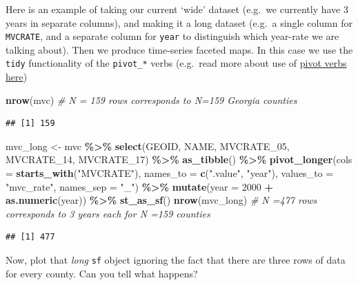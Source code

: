 \documentclass[
]{book}
\newenvironment{Shaded}{\begin{snugshade}}{\end{snugshade}}
\newcommand{\AttributeTok}[1]{\textcolor[rgb]{0.13,0.29,0.53}{#1}}
\newcommand{\CommentTok}[1]{\textcolor[rgb]{0.56,0.35,0.01}{\textit{#1}}}
\newcommand{\DecValTok}[1]{\textcolor[rgb]{0.00,0.00,0.81}{#1}}
\newcommand{\FunctionTok}[1]{\textcolor[rgb]{0.13,0.29,0.53}{\textbf{#1}}}
\newcommand{\NormalTok}[1]{#1}
\newcommand{\OtherTok}[1]{\textcolor[rgb]{0.56,0.35,0.01}{#1}}
\newcommand{\SpecialCharTok}[1]{\textcolor[rgb]{0.81,0.36,0.00}{\textbf{#1}}}
\newcommand{\StringTok}[1]{\textcolor[rgb]{0.31,0.60,0.02}{#1}}
\begin{document}
Here is an example of taking our current `wide' dataset (e.g.~we currently have 3 years in separate columns), and making it a long dataset (e.g.~a single column for \texttt{MVCRATE}, and a separate column for \texttt{year} to distinguish which year-rate we are talking about). Then we produce time-series faceted maps. In this case we use the \texttt{tidy} functionality of the \texttt{pivot\_*} verbs (e.g.~read more about use of \protect\hyperlink{pivot_}{pivot verbs here})

\begin{Shaded}
\begin{Highlighting}[]
\FunctionTok{nrow}\NormalTok{(mvc) }\CommentTok{\# N = 159 rows corresponds to N=159 Georgia counties}
\end{Highlighting}
\end{Shaded}

\begin{verbatim}
## [1] 159
\end{verbatim}

\begin{Shaded}
\begin{Highlighting}[]
\NormalTok{mvc\_long }\OtherTok{\textless{}{-}}\NormalTok{ mvc }\SpecialCharTok{\%\textgreater{}\%}
  \FunctionTok{select}\NormalTok{(GEOID, NAME, MVCRATE\_05, MVCRATE\_14, MVCRATE\_17) }\SpecialCharTok{\%\textgreater{}\%}
  \FunctionTok{as\_tibble}\NormalTok{() }\SpecialCharTok{\%\textgreater{}\%}
  \FunctionTok{pivot\_longer}\NormalTok{(}\AttributeTok{cols =} \FunctionTok{starts\_with}\NormalTok{(}\StringTok{"MVCRATE"}\NormalTok{),}
               \AttributeTok{names\_to =} \FunctionTok{c}\NormalTok{(}\StringTok{".value"}\NormalTok{, }\StringTok{"year"}\NormalTok{),}
               \AttributeTok{values\_to =} \StringTok{"mvc\_rate"}\NormalTok{,}
               \AttributeTok{names\_sep =} \StringTok{"\_"}\NormalTok{) }\SpecialCharTok{\%\textgreater{}\%}
  \FunctionTok{mutate}\NormalTok{(}\AttributeTok{year =} \DecValTok{2000} \SpecialCharTok{+} \FunctionTok{as.numeric}\NormalTok{(year)) }\SpecialCharTok{\%\textgreater{}\%}
  \FunctionTok{st\_as\_sf}\NormalTok{()}
\FunctionTok{nrow}\NormalTok{(mvc\_long) }\CommentTok{\# N =477 rows corresponds to 3 years each for N =159 counties  }
\end{Highlighting}
\end{Shaded}

\begin{verbatim}
## [1] 477
\end{verbatim}

Now, plot that \emph{long} \texttt{sf} object ignoring the fact that there are three rows of data for every county. Can you tell what happens?
\end{document}
